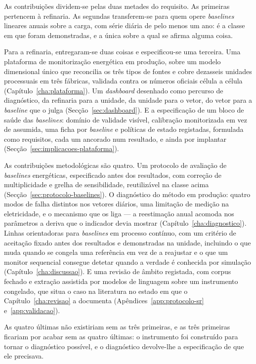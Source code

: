 As contribuições dividem-se pelas duas metades do requisito. As
primeiras pertencem à refinaria. As segundas transferem-se para quem
opere \emph{baselines} lineares anuais sobre a carga, com série diária
de pelo menos um ano: é a classe em que foram demonstradas, e a única
sobre a qual se afirma alguma coisa.

Para a refinaria, entregaram-se duas coisas e especificou-se uma
terceira. Uma plataforma de monitorização energética em produção, sobre
um modelo dimensional único que reconcilia os três tipos de fontes e cobre
dezasseis unidades processuais em três fábricas, validada contra os
números oficiais célula a célula (Capítulo~\ref{cha:plataforma}). Um
\emph{dashboard} desenhado como percurso de diagnóstico, da refinaria
para a unidade, da unidade para o vetor, do vetor para a \emph{baseline}
que o julga (Secção~\ref{sec:dashboard}). E a especificação de um bloco
de saúde das \emph{baselines}: domínio de
validade visível, calibração monitorizada em vez de assumida, uma ficha
por \emph{baseline} e políticas de estado registadas, formulada como
requisitos, cada um ancorado num resultado, e ainda por implantar
(Secção~\ref{sec:implicacoes-plataforma}).

As contribuições metodológicas são quatro. Um protocolo de avaliação de
\emph{baselines} energéticas, especificado antes dos resultados, com
correção de multiplicidade e grelha de sensibilidade, reutilizável na
classe acima (Secção~\ref{sec:protocolo-baselines}). O diagnóstico do
método em produção: quatro modos de falha distintos nos vetores diários,
uma limitação de medição na eletricidade, e o mecanismo que os liga --- a
reestimação anual acomoda nos parâmetros a deriva que o indicador devia
mostrar (Capítulo~\ref{cha:diagnostico}). Linhas orientadoras para
\emph{baselines} em processo contínuo, com um critério de aceitação
fixado antes dos resultados e demonstradas na unidade, incluindo o que muda quando se congela
uma referência em vez de a reajustar e o que um monitor sequencial
consegue detetar quando a verdade é conhecida por simulação
(Capítulo~\ref{cha:discussao}). E uma revisão de âmbito
registada, com corpus fechado e extração assistida por modelos de
linguagem sobre um instrumento congelado, que situa o caso na literatura no estado em que o
Capítulo~\ref{cha:revisao} a documenta (Apêndices~\ref{app:protocolo-sr}
e~\ref{app:validacao}).

As quatro últimas não existiriam sem as três primeiras, e as três
primeiras ficariam por acabar sem as quatro últimas: o instrumento foi
construído para tornar o diagnóstico possível, e o diagnóstico
devolve-lhe a especificação de que ele precisava.

